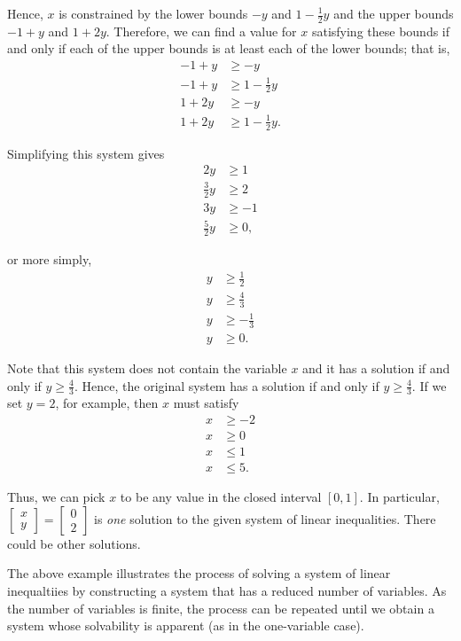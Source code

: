 \documentclass[]{book}
\theoremstyle{definition}
\theoremstyle{definition}
\theoremstyle{remark}
\begin{document}
Hence, \(x\) is constrained by the lower bounds \(-y\) and
\(1 - \frac{1}{2}y\) and the upper bounds \(-1 +y\) and \(1 + 2y\).
Therefore, we can find a value for \(x\) satisfying these bounds if and
only if each of the upper bounds is at least each of the lower bounds;
that is,
\begin{align*}
-1 + y & \geq -y \\
-1 + y & \geq 1 - \frac{1}{2}y \\
1 + 2y & \geq -y \\
1 + 2y & \geq 1 - \frac{1}{2}y.
\end{align*}

Simplifying this system gives
\begin{align*}
2y & \geq 1 \\
\frac{3}{2}y & \geq 2  \\
3y & \geq -1 \\
\frac{5}{2}y & \geq 0,
\end{align*}

or more simply,
\begin{align*}
y & \geq \frac{1}{2} \\
y & \geq \frac{4}{3}  \\
y & \geq -\frac{1}{3} \\
y & \geq 0.
\end{align*}

Note that this system does not contain the variable \(x\) and it has a
solution if and only if \(y \geq \frac{4}{3}\). Hence, the original
system has a solution if and only if \(y \geq \frac{4}{3}\). If we set
\(y = 2\), for example, then \(x\) must satisfy
\begin{align*}
x & \geq - 2  \\
x & \geq 0 \\
x & \leq 1 \\
x & \leq 5.
\end{align*}

Thus, we can pick \(x\) to be any value in the closed interval
\([0,1]\). In particular,
\(\begin{bmatrix} x\\ y\end{bmatrix} = \begin{bmatrix} 0 \\ 2\end{bmatrix}\)
is \emph{one} solution to the given system of linear inequalities. There
could be other solutions.

The above example illustrates the process of solving a system of linear
inequaltiies by constructing a system that has a reduced number of
variables. As the number of variables is finite, the process can be
repeated until we obtain a system whose solvability is apparent (as in
the one-variable case).
\end{document}
